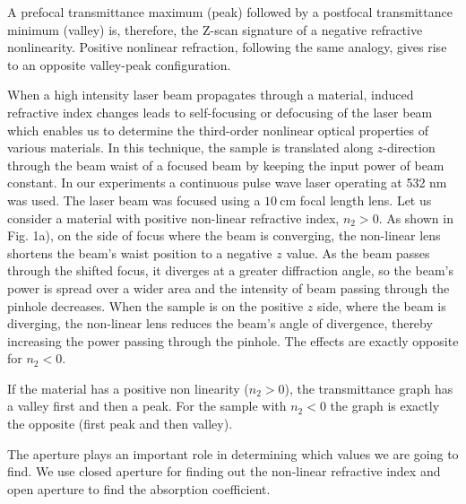 \documentclass[%
 reprint,
 amsmath,amssymb,
 aps,
]{revtex4-2}
\begin{document}
		A prefocal transmittance maximum (peak) followed by a postfocal transmittance minimum (valley) is, therefore, the Z-scan signature of a negative refractive nonlinearity. Positive nonlinear refraction, following the same analogy, gives rise to an opposite valley-peak configuration.
		\par 
		When a high intensity laser beam propagates through a material, induced
		refractive index changes leads to self-focusing or defocusing of the laser beam
		which enables us to determine the third-order nonlinear optical properties of
		various materials. In this technique, the sample is translated along $ z $-direction through the beam waist of a focused beam by keeping the input power
		of beam constant. In our experiments a continuous pulse wave laser operating at 532 nm was used. The laser beam was focused using a $ \SI{10}{\centi \meter} $ focal length lens. Let us consider a material with positive non-linear refractive
		index, $ n_2 > 0 $. As shown in Fig. 1a), on the side of focus where the beam is
		converging, the non-linear lens shortens the beam's waist position to a negative $ z $ value. As the beam passes through the shifted focus, it diverges at
		a greater diffraction angle, so the beam's power is spread over a wider area
		and the intensity of beam passing through the pinhole decreases. When the
		sample is on the positive $ z $ side, where the beam is diverging, the non-linear
		lens reduces the beam's angle of divergence, thereby increasing the power
		passing through the pinhole. The effects are exactly opposite for $ n_2 < 0 $.
		\par 
		If the material has a positive non linearity ($ n_2 > 0 $), the transmittance
		graph has a valley first and then a peak. For the sample with $ n_2 < 0 $ the
		graph is exactly the opposite (first peak and then valley).
		\par 
		The aperture plays an important role in determining which values we are
		going to find. We use closed aperture for finding out the non-linear refractive
		index and open aperture to find the absorption coefficient.
\end{document}
